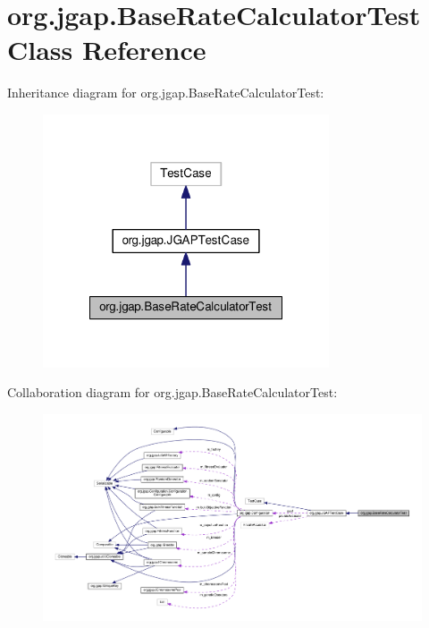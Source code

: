 \hypertarget{classorg_1_1jgap_1_1_base_rate_calculator_test}{\section{org.\-jgap.\-Base\-Rate\-Calculator\-Test Class Reference}
\label{classorg_1_1jgap_1_1_base_rate_calculator_test}
}


Inheritance diagram for org.\-jgap.\-Base\-Rate\-Calculator\-Test\-:
\nopagebreak
\begin{figure}[H]
\begin{center}
\leavevmode
\includegraphics[width=240pt]{classorg_1_1jgap_1_1_base_rate_calculator_test__inherit__graph}
\end{center}
\end{figure}


Collaboration diagram for org.\-jgap.\-Base\-Rate\-Calculator\-Test\-:
\nopagebreak
\begin{figure}[H]
\begin{center}
\leavevmode
\includegraphics[width=350pt]{classorg_1_1jgap_1_1_base_rate_calculator_test__coll__graph}
\end{center}
\end{figure}
